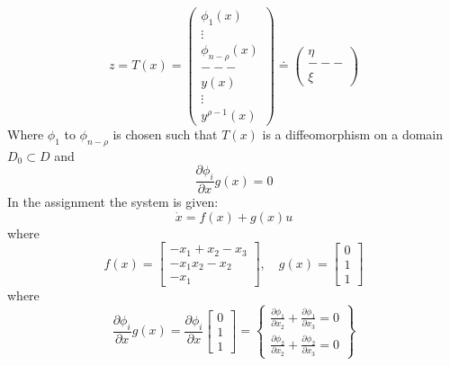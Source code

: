 \begin{equation}
        z = T(x) = 
        \begin{pmatrix}
                \phi_1(x) \\
                \vdots \\
                \phi_{n - \rho}(x) \\
                --- \\
                y(x) \\
                \vdots \\
                y^{\rho - 1}(x)
        \end{pmatrix}
        \doteq
        \begin{pmatrix}
                \eta \\
                --- \\
                \xi
        \end{pmatrix}
\end{equation}
Where $\phi_1$ to $\phi_{n - \rho}$ is chosen such that $T(x)$ is a diffeomorphism on a domain $D_0 \subset D$ and 
\begin{equation}
        \frac{\partial \phi_{i}}{\partial x}g(x) = 0
\end{equation}
In the assignment the system is given:
\begin{equation}
        \dot{x} = f(x) + g(x)u
\end{equation}
where 
\begin{equation}
        f(x) = 
        \begin{bmatrix}
                -x_1 + x_2 - x_3 \\
                -x_1 x_2 - x_2 \\
                -x_1
        \end{bmatrix}
        ,\quad 
        g(x) = 
        \begin{bmatrix}
                0 \\
                1 \\
                1
        \end{bmatrix}
\end{equation}
where 
\begin{equation}
        \frac{\partial \phi_{i}}{\partial x}g(x) = \frac{\partial \phi_{i}}{\partial x} 
        \begin{bmatrix}
                0 \\
                1 \\
                1
        \end{bmatrix}
        =
        \begin{Bmatrix}
                \frac{\partial \phi_{1}}{\partial x_2} + \frac{\partial \phi_{1}}{\partial x_{3}} = 0 \\
                \frac{\partial \phi_{2}}{\partial x_2} + \frac{\partial \phi_{2}}{\partial x_{3}} = 0
        \end{Bmatrix}
\end{equation}
